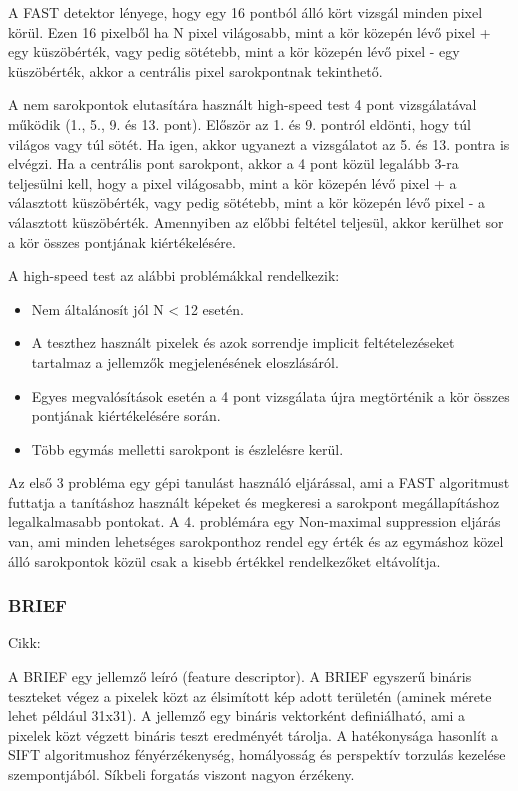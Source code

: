 A FAST detektor lényege, hogy egy 16 pontból álló kört vizsgál minden pixel körül. Ezen 16 pixelből ha N pixel világosabb, mint a kör közepén lévő pixel + egy küszöbérték, vagy pedig sötétebb, mint a kör közepén lévő pixel - egy küszöbérték, akkor a centrális pixel sarokpontnak tekinthető.

A nem sarokpontok elutasítára használt high-speed test 4 pont vizsgálatával működik (1., 5., 9. és 13. pont).
Először az 1. és 9. pontról eldönti, hogy túl világos vagy túl sötét.
Ha igen, akkor ugyanezt a vizsgálatot az 5. és 13. pontra is elvégzi.
Ha a centrális pont sarokpont, akkor a 4 pont közül legalább 3-ra teljesülni kell, hogy a pixel világosabb, mint a kör közepén lévő pixel + a választott küszöbérték, vagy pedig sötétebb, mint a kör közepén lévő pixel - a választott küszöbérték.
Amennyiben az előbbi feltétel teljesül, akkor kerülhet sor a kör összes pontjának kiértékelésére.

A high-speed test az alábbi problémákkal rendelkezik:

\begin{itemize}
	\item Nem általánosít jól N < 12 esetén.
	\item A teszthez használt pixelek és azok sorrendje implicit feltételezéseket tartalmaz a jellemzők megjelenésének eloszlásáról.
	\item Egyes megvalósítások esetén a 4 pont vizsgálata újra megtörténik a kör összes pontjának kiértékelésére során.
	\item Több egymás melletti sarokpont is észlelésre kerül.
\end{itemize}

Az első 3 probléma egy gépi tanulást használó eljárással, ami a FAST algoritmust futtatja a tanításhoz használt képeket és megkeresi a sarokpont megállapításhoz legalkalmasabb pontokat.
A 4. problémára egy Non-maximal suppression eljárás van, ami minden lehetséges sarokponthoz rendel egy érték és az egymáshoz közel álló sarokpontok közül csak a kisebb értékkel rendelkezőket eltávolítja.

\subsubsection{BRIEF}

Cikk:\cite{rublee2011orb}

A BRIEF egy jellemző leíró (feature descriptor).
A BRIEF egyszerű bináris teszteket végez a pixelek közt az élsimított kép adott területén (aminek mérete lehet például 31x31).
A jellemző egy bináris vektorként definiálható, ami a pixelek közt végzett bináris teszt eredményét tárolja.
A hatékonysága hasonlít a SIFT algoritmushoz fényérzékenység, homályosság és perspektív torzulás kezelése szempontjából.
Síkbeli forgatás viszont nagyon érzékeny.

